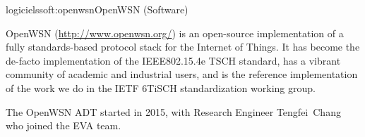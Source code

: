 \documentclass{ra2016}
\begin{document}
\begin{module}{logiciels}{soft:openwsn}{OpenWSN (Software)}
\label{soft:openwsn}

\begin{participants}
\end{participants}

OpenWSN (\url{http://www.openwsn.org/}) is an open-source implementation of a fully standards-based protocol stack for the Internet of Things.
It has become the de-facto implementation of the IEEE802.15.4e TSCH standard, has a vibrant community of academic and industrial users, and is the reference implementation of the work we do in  the IETF 6TiSCH standardization working group.

The OpenWSN ADT started in 2015, with Research Engineer Tengfei~Chang who joined the EVA team.


\end{module}
\end{document}
